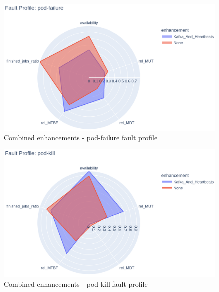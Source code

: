 \begin{figure}[h]
	\centering
	\includegraphics[width=140mm, keepaspectratio]{figures/kafka_and_hb_with_base_pod-failure.png}
	\caption{Combined enhancements - pod-failure fault profile}
	\label{fig:combined-results-pod-failure}
\end{figure}

\begin{figure}[h]
	\centering
	\includegraphics[width=140mm, keepaspectratio]{figures/kafka_and_hb_with_base_pod-kill.png}
	\caption{Combined enhancements - pod-kill fault profile}
	\label{fig:combined-results-pod-kill}
\end{figure}


